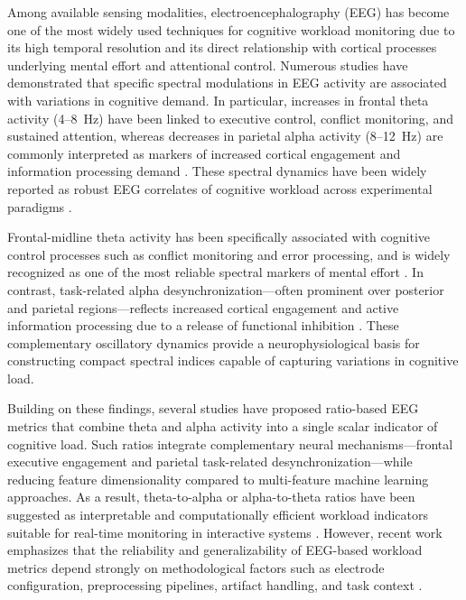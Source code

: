 \documentclass[10pt]{iopart}
\begin{document}
Among available sensing modalities, electroencephalography (EEG)
has become one of the most widely used techniques for cognitive
workload monitoring due to its high temporal resolution and its
direct relationship with cortical processes underlying mental
effort and attentional control. Numerous studies have demonstrated
that specific spectral modulations in EEG activity are associated
with variations in cognitive demand. In particular, increases in
frontal theta activity (4--8~Hz) have been linked to executive
control, conflict monitoring, and sustained attention, whereas
decreases in parietal alpha activity (8--12~Hz) are commonly
interpreted as markers of increased cortical engagement and
information processing demand \cite{c8}. These spectral dynamics
have been widely reported as robust EEG correlates of cognitive
workload across experimental paradigms \cite{c1,c4}.

Frontal-midline theta activity has been specifically associated
with cognitive control processes such as conflict monitoring and
error processing, and is widely recognized as one of the most
reliable spectral markers of mental effort
\cite{CavanaghFrank2014_FrontalTheta}. In contrast,
task-related alpha desynchronization---often prominent over
posterior and parietal regions---reflects increased cortical
engagement and active information processing due to a release of
functional inhibition
\cite{Klimesch2007_AlphaInhibitionTiming,Klimesch1999_AlphaTheta}.
These complementary oscillatory dynamics provide a
neurophysiological basis for constructing compact spectral indices
capable of capturing variations in cognitive load.

Building on these findings, several studies have proposed
ratio-based EEG metrics that combine theta and alpha activity into
a single scalar indicator of cognitive load. Such ratios integrate
complementary neural mechanisms---frontal executive engagement and
parietal task-related desynchronization---while reducing feature
dimensionality compared to multi-feature machine learning
approaches. As a result, theta-to-alpha or alpha-to-theta ratios
have been suggested as interpretable and computationally efficient
workload indicators suitable for real-time monitoring in
interactive systems \cite{c1,c7}. However, recent work emphasizes
that the reliability and generalizability of EEG-based workload
metrics depend strongly on methodological factors such as electrode
configuration, preprocessing pipelines, artifact handling, and
task context \cite{c4,c6,Mastropietro2023_ReliabilityFzPz}.
\end{document}
